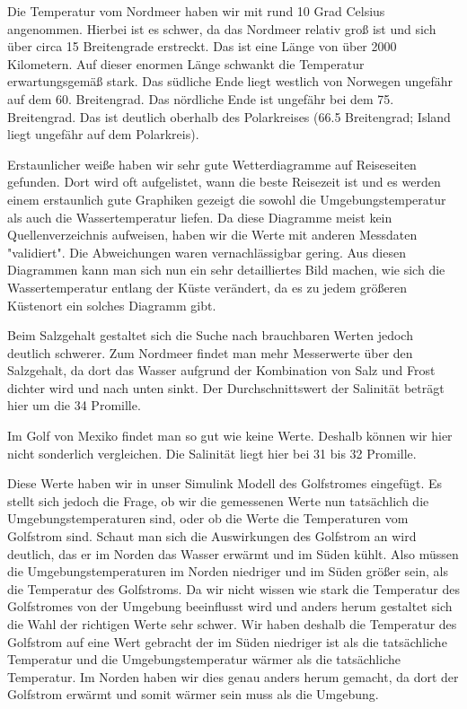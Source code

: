 \documentclass[a4paper,twoside]{article}
\begin{document}
	Die Temperatur vom Nordmeer haben wir mit rund 10 Grad Celsius angenommen. Hierbei ist es schwer, da das Nordmeer relativ groß ist und sich über circa 15 Breitengrade erstreckt. Das ist eine Länge von über 2000 Kilometern. Auf dieser enormen Länge schwankt die Temperatur erwartungsgemäß stark. Das südliche Ende liegt westlich von Norwegen ungefähr auf dem 60. Breitengrad. Das nördliche Ende ist ungefähr bei dem 75. Breitengrad. Das ist deutlich oberhalb des Polarkreises (66.5 Breitengrad; Island liegt ungefähr auf dem Polarkreis).

	Erstaunlicher weiße haben wir sehr gute Wetterdiagramme auf Reiseseiten gefunden. Dort wird oft aufgelistet, wann die beste Reisezeit ist und es werden einem erstaunlich gute Graphiken gezeigt die sowohl die Umgebungstemperatur als auch die Wassertemperatur liefen. Da diese Diagramme meist kein Quellenverzeichnis aufweisen, haben wir die Werte mit anderen Messdaten "validiert". Die Abweichungen waren vernachlässigbar gering. Aus diesen Diagrammen kann man sich nun ein sehr detailliertes Bild machen, wie sich die Wassertemperatur entlang der Küste verändert, da es zu jedem größeren Küstenort ein solches Diagramm gibt.

	Beim Salzgehalt gestaltet sich die Suche nach brauchbaren Werten jedoch deutlich schwerer. Zum Nordmeer findet man mehr Messerwerte über den Salzgehalt, da dort das Wasser aufgrund der Kombination von Salz und Frost dichter wird und nach unten sinkt. Der Durchschnittswert der Salinität beträgt hier um die 34 Promille. 

	Im Golf von Mexiko findet man so gut wie keine Werte. Deshalb können wir hier nicht sonderlich vergleichen. Die Salinität liegt hier bei 31 bis 32 Promille.

	Diese Werte haben wir in unser Simulink Modell des Golfstromes eingefügt. Es stellt sich jedoch die Frage, ob wir die gemessenen Werte nun tatsächlich die Umgebungstemperaturen sind, oder ob die Werte die Temperaturen vom Golfstrom sind. Schaut man sich die Auswirkungen des Golfstrom an wird deutlich, das er im Norden das Wasser erwärmt und im Süden kühlt. Also müssen die Umgebungstemperaturen im Norden niedriger und im Süden größer sein, als die Temperatur des Golfstroms. Da wir nicht wissen wie stark die Temperatur des Golfstromes von der Umgebung beeinflusst wird und anders herum gestaltet sich die Wahl der richtigen Werte sehr schwer. Wir haben deshalb die Temperatur des Golfstrom auf eine Wert gebracht der im Süden niedriger ist als die tatsächliche Temperatur und die Umgebungstemperatur wärmer als die tatsächliche Temperatur. Im Norden haben wir dies genau anders herum gemacht, da dort der Golfstrom erwärmt und somit wärmer sein muss als die Umgebung.
	
\end{document}
